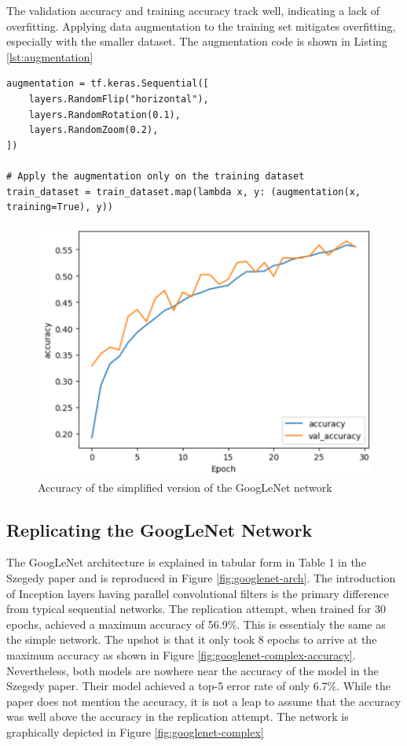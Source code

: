 \documentclass{article}
\begin{document}
The validation accuracy and training accuracy track well, indicating a lack of overfitting. Applying data augmentation to the training set mitigates overfitting, especially with the smaller dataset. The augmentation code is shown in Listing \ref{lst:augmentation}

\begin{lstlisting}[caption={Augmentation code}, label={lst:augmentation}]
augmentation = tf.keras.Sequential([
    layers.RandomFlip("horizontal"),
    layers.RandomRotation(0.1),
    layers.RandomZoom(0.2),
])

# Apply the augmentation only on the training dataset
train_dataset = train_dataset.map(lambda x, y: (augmentation(x, training=True), y))
\end{lstlisting}

\begin{figure}[ht]
    \centering
    \includegraphics[scale=0.7]{project/paper_images/googlenet_simple_accuracy.png}
    \caption{Accuracy of the simplified version of the GoogLeNet network}
    \label{fig:googlenet-simple-accuracy}
\end{figure}

\subsection{Replicating the GoogLeNet Network}
The GoogLeNet architecture is explained in tabular form in Table 1 in the Szegedy paper and is reproduced in Figure \ref{fig:googlenet-arch}. The introduction of Inception layers having parallel convolutional filters is the primary difference from typical sequential networks. The replication attempt, when trained for 30 epochs, achieved a maximum accuracy of 56.9\%. This is essentialy the same as the simple network. The upshot is that it only took 8 epochs to arrive at the maximum accuracy as shown in Figure \ref{fig:googlenet-complex-accuracy}. Nevertheless, both models are nowhere near the accuracy of the model in the Szegedy paper. Their model achieved a top-5 error rate of only 6.7\%. While the paper does not mention the accuracy, it is not a leap to assume that the accuracy was well above the accuracy in the replication attempt. The network is graphically depicted in Figure \ref{fig:googlenet-complex}
\end{document}
